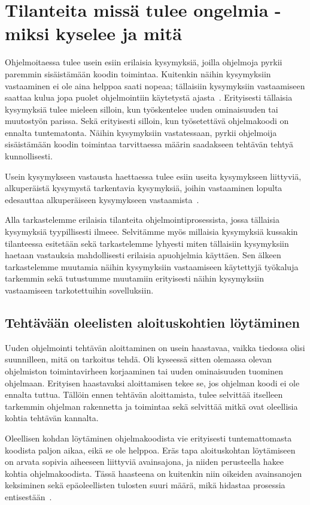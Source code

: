 \documentclass[finnish]{../tktltiki2}
\theoremstyle{definition}
\theoremstyle{remark}
\begin{document}
\section{Tilanteita missä tulee ongelmia - miksi kyselee ja mitä}
Ohjelmoitaessa tulee usein esiin erilaisia kysymyksiä, joilla ohjelmoja pyrkii paremmin sisäistämään koodin toimintaa. Kuitenkin näihin kysymyksiin vastaaminen ei ole aina helppoa saati nopeaa; tällaisiin kysymyksiin vastaamiseen saattaa kulua jopa puolet ohjelmointiin käytetystä ajasta~\cite{eliciting-design-requirements-for-maintenance-oriented-ides}. Erityisesti tällaisia kysymyksiä tulee mieleen silloin, kun työskentelee uuden ominaisuuden tai muutostyön parissa. Sekä erityisesti silloin, kun työsetettävä ohjelmakoodi on ennalta tuntematonta.
Näihin kysymyksiin vastatessaan, pyrkii ohjelmoija sisäistämään koodin toimintaa tarvittaessa määrin saadakseen tehtävän tehtyä kunnollisesti.

Usein kysymykseen vastausta haettaessa tulee esiin useita kysymykseen liittyviä, alkuperäistä kysymystä tarkentavia kysymyksiä, joihin vastaaminen lopulta edesauttaa alkuperäiseen kysymykseen vastaamista~\cite{questions-during-software-evolution-tasks}.

Alla tarkastelemme erilaisia tilanteita ohjelmointiprosessista, jossa tällaisia kysymyksiä  tyypillisesti ilmeee. Selvitämme myös millaisia kysymyksiä kussakin tilanteessa esitetään sekä tarkastelemme lyhyesti miten tällaisiin kysymyksiin haetaan vastauksia mahdollisesti erilaisia apuohjelmia käyttäen. Sen älkeen tarkastelemme muutamia näihin kysymyksiin vastaamiseen käytettyjä työkaluja tarkemmin sekä tutustumme muutamiin erityisesti näihin kysymyksiin vastaamiseen tarkotettuihin sovelluksiin.

\subsection{Tehtävään oleelisten aloituskohtien löytäminen}
Uuden ohjelmointi tehtävän aloittaminen on usein haastavaa, vaikka tiedossa olisi suunnilleen, mitä on tarkoitus tehdä. Oli kyseessä sitten olemassa olevan ohjelmiston toimintavirheen korjaaminen tai uuden ominaisuuden tuominen ohjelmaan. Erityisen haastavaksi aloittamisen tekee se, jos ohjelman koodi ei ole ennalta tuttua. Tällöin ennen tehtävän aloittamista, tulee selvittää itselleen tarkemmin ohjelman rakennetta ja toimintaa sekä selvittää mitkä ovat oleellisia kohtia tehtävän kannalta.

Oleellisen kohdan löytäminen ohjelmakoodista vie erityisesti tuntemattomasta koodista paljon aikaa, eikä se ole helppoa.
Eräs tapa aloituskohtan löytämiseen on arvata sopivia aiheeseen liittyviä avainsajona, ja niiden perusteella hakee kohtia ohjelmakoodista. Tässä haasteena on kuitenkin niin oikeiden avainsanojen keksiminen sekä epäoleellisten tulosten suuri määrä, mikä hidastaa prosessia entisestään~\cite{what-to-search-for}.
\end{document}
